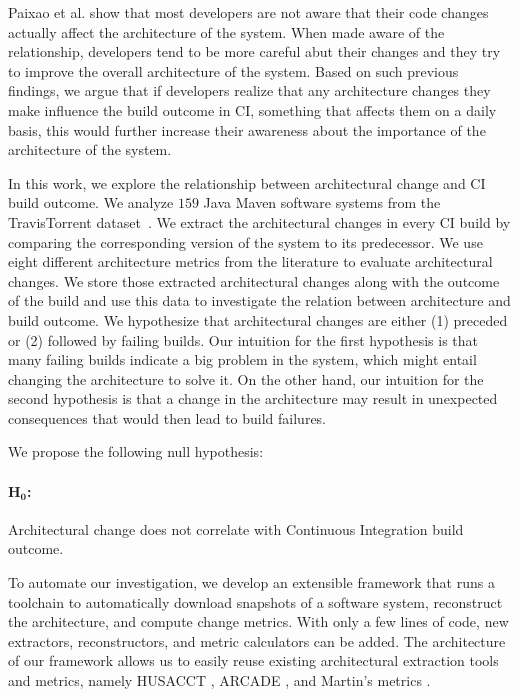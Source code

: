 \documentclass[sigconf, anonymous, review]{acmart}
\begin{document}
Paixao et al. \cite{ImpactAwareness} show that most developers are not aware that their code changes actually affect the architecture of the system. When made aware of the relationship, developers tend to be more careful abut their changes and they try to improve the overall architecture of the system.
Based on such previous findings, we argue that if developers realize that any architecture changes they make influence the build outcome in CI, something that affects them on a daily basis, this would further increase their awareness about the importance of the architecture of the system.

In this work, we explore the relationship between architectural change and CI build outcome.
We analyze $159$ Java Maven software systems from the TravisTorrent dataset~\cite{TravisTorrent}. 
We extract the architectural changes in every CI build by comparing the corresponding version of the system to its predecessor.
We use eight different architecture metrics from the literature to evaluate architectural changes.  
We store those extracted architectural changes along with the outcome of the build and use this data to investigate the relation between architecture and build outcome.
We hypothesize that architectural changes are either (1) preceded or (2) followed by failing builds. 
Our intuition for the first hypothesis is that many failing builds indicate a big problem in the system, which might entail changing the architecture to solve it. 
On the other hand, our intuition for the second hypothesis is that a change in the architecture may result in unexpected consequences that would then lead to build failures.

We propose the following null hypothesis:

\paragraph{$\mathbf{H_0}$:} Architectural change does not correlate with Continuous Integration build outcome. 
\vspace{0.2cm}

To automate our investigation, we develop an extensible framework that runs a toolchain to automatically download snapshots of a software system, reconstruct the architecture, and compute change metrics. With only a few lines of code, new extractors, reconstructors, and metric calculators can be added. 
The architecture of our framework allows us to easily reuse existing architectural extraction tools and metrics, namely HUSACCT \cite{Husacct1}, ARCADE \cite{Arcade}, and Martin's metrics \cite{martinsMetrics}.
\end{document}
